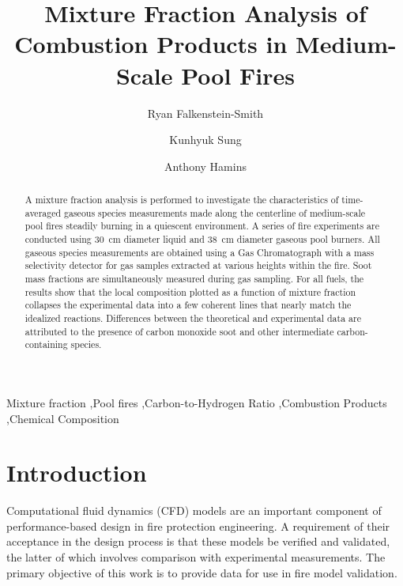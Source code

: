 \documentclass[preprint,review,12pt]{elsarticle}
\begin{document}
\begin{frontmatter}

\title{Mixture Fraction Analysis of Combustion Products in Medium-Scale Pool Fires}

\author{Ryan Falkenstein-Smith}

\author{Kunhyuk Sung}
\author{Anthony Hamins}

\address{National Institute of Standards and Technology, 100 Bureau Dr., Gaithersburg, MD 20899, United States of America}

\begin{abstract}
A mixture fraction analysis is performed to investigate the characteristics of time-averaged gaseous species measurements made along the centerline of medium-scale pool fires steadily burning in a quiescent environment. A series of fire experiments are conducted using 30~cm diameter liquid and 38~cm diameter gaseous pool burners. All gaseous species measurements are obtained using a Gas Chromatograph with a mass selectivity detector for gas samples extracted at various heights within the fire. Soot mass fractions are simultaneously measured during gas sampling. For all fuels, the results show that the local composition plotted as a function of mixture fraction collapses the experimental data into a few coherent lines that nearly match the idealized reactions. Differences between the theoretical and experimental data are attributed to the presence of carbon monoxide soot and other intermediate carbon-containing species.
\end{abstract}

\begin{keyword}

Mixture fraction \sep Pool fires \sep Carbon-to-Hydrogen Ratio \sep Combustion Products \sep Chemical Composition

\end{keyword}

\end{frontmatter}


\ifdefined \wordcount
\clearpage
\fi

\section{Introduction}
\label{Introduction}
Computational fluid dynamics (CFD) models are an important component of performance-based design in fire protection engineering. A requirement of their acceptance in the design process is that these models be verified and validated, the latter of which involves comparison with experimental measurements. The primary objective of this work is to provide data for use in fire model validation.
\end{document}
